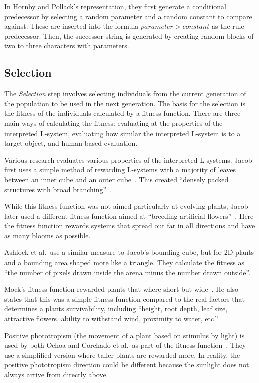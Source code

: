 In Hornby and Pollack's representation, they first generate a conditional predecessor by selecting a random parameter and a random constant to compare against.
These are inserted into the formula $parameter > constant$ as the rule predecessor.
Then, the successor string is generated by creating random blocks of two to three characters with parameters.~\cite{2001Hornby}

\subsection{Selection}
The \textit{Selection} step involves selecting individuals from the current generation of the population to be used in the next generation.
The basis for the selection is the fitness of the individuals calculated by a fitness function.
There are three main ways of calculating the fitness: evaluating at the properties of the interpreted \gls{L-system}, evaluating how similar the interpreted \gls{L-system} is to a target object, and human-based evaluation.

Various research evaluates various properties of the interpreted \glspl{L-system}.
Jacob first uses a simple method of rewarding \glspl{L-system} with a majority of leaves between an inner cube and an outer cube~\cite{1994Jacob}.
This created ``densely packed structures with broad branching''~\cite{1994Jacob}.

While this fitness function was not aimed particularly at evolving plants, Jacob later used a different fitness function aimed at ``breeding artificial flowers''~\cite{1994Jacob}.
Here the fitness function rewards systems that spread out far in all directions and have as many blooms as possible.

Ashlock et al.\ use a similar measure to Jacob's bounding cube, but for 2D plants and a bounding area shaped more like a triangle.
They calculate the fitness as ``the number of pixels drawn inside the arena minus the number drawn outside''.
~\cite{2006Ashlock}

Mock's fitness function rewarded plants that where short but wide~\cite{1998Mock}.
He also states that this was a simple fitness function compared to the real factors that determines a plants survivability, including ``height, root depth, leaf size, attractive flowers, ability to withstand wind, proximity to water, etc.''~\cite{1998Mock}

Positive phototropism (the movement of a plant based on stimulus by light) is used by both Ochoa and Corchado et al.\ as part of the fitness function~\cite{1998Ochoa, 2009Corchado}.
They use a simplified version where taller plants are rewarded more.
In reality, the positive phototropism direction could be different because the sunlight does not always arrive from directly above.

